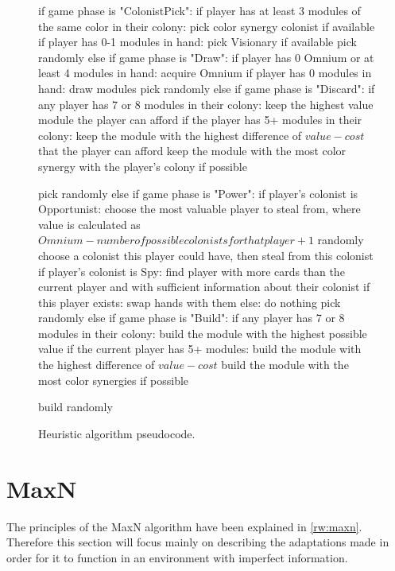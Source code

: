 \begin{figure}[ht]
\begin{code}[commandchars=\\\{\},codes={\catcode`\$=3\catcode`\^=7\catcode`\_=8}]
if game phase is "ColonistPick":
    if player has at least 3 modules of the same color in their colony:
        pick color synergy colonist if available
    if player has 0-1 modules in hand:
        pick Visionary if available
    pick randomly
else if game phase is "Draw":
    if player has 0 Omnium or at least 4 modules in hand:
        acquire Omnium
    if player has 0 modules in hand:
        draw modules
    pick randomly
else if game phase is "Discard":
    if any player has 7 or 8 modules in their colony:
        keep the highest value module the player can afford
    if the player has 5+ modules in their colony:
        keep the module with the highest difference of $value - cost$
        that the player can afford
    keep the module with the most color synergy with the player's
    colony if possible

    pick randomly
else if game phase is "Power":
    if player's colonist is Opportunist:
        choose the most valuable player to steal from,
        where value is calculated as
        $Omnium - number of possible colonists for that player + 1$
        randomly choose a colonist this player could have,
        then steal from this colonist
    if player's colonist is Spy:
        find player with more cards than the current player
        and with sufficient information about their colonist
        if this player exists:
            swap hands with them
        else:
            do nothing
    pick randomly
else if game phase is "Build":
    if any player has 7 or 8 modules in their colony:
        build the module with the highest possible value
    if the current player has 5+ modules:
        build the module with the highest difference of $value - cost$
    build the module with the most color synergies if possible

    build randomly
\end{code}
\caption{Heuristic algorithm pseudocode.}\label{algo:heur}
\end{figure}

\clearpage
\section{MaxN}
\label{sec:algomaxn}

The principles of the MaxN algorithm have been explained in \autoref{rw:maxn}. Therefore
this section will focus mainly on describing the adaptations made in order for it
to function in an environment with imperfect information.

